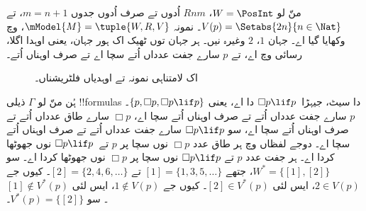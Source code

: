 \documentclass[../../../include/open-logic-section]{subfiles}
\begin{document}
\begin{ex}
  منّ لو $W = \PosInt$، $Rnm$ اُدوں تے صرف اُدوں جدوں $m = n + 1$، تے $V(p) = \Setabs{2n}{n \in
    \Nat}$۔ نمونہ $\mModel{M} = \tuple{W, R, V}$،
   وچ وکھایا گیا اے۔ جہان $1$، $2$ وغیرہ نیں۔ ہر جہان توں ٹھیک اک ہور جہان، یعنی اوہدا اگلا، رسائی وچ اے، تے $p$ سارے جفت عدداں اُتے سچا اے تے صرف اوہناں اُتے۔

  \begin{figure}
    \centering

    \caption{اک لامتناہی نمونہ تے اوہدیاں فلٹریشناں۔}
  \end{figure}

  ہُن منّ لو $\Gamma$ ذیلی !!{formula}s دا سیٹ، جیہڑا~$\Box p \lif p$ دا اے،
  یعنی $\{p, \Box p, \Box p \lif p\}$۔ $p$ سارے جفت عدداں اُتے تے صرف اوہناں اُتے سچا اے، $\Box p$ سارے طاق عدداں اُتے تے صرف اوہناں اُتے سچا اے، سو $\Box p \lif p$ سارے جفت عدداں اُتے تے صرف اوہناں اُتے سچا اے۔ دوجے لفظاں وچ ہر طاق عدد $\Box p$ نوں سچا پر $p$ تے~$\Box
  p \lif p$ نوں جھوٹھا کردا اے۔ ہر جفت عدد $p$ تے $\Box p \lif p$ نوں سچا پر $\Box p$ نوں جھوٹھا کردا اے۔ سو $W^* = \{ [1], [2] \}$، جتھے $[1] =
  \{1, 3, 5, \dots\}$ تے $[2] = \{2, 4, 6, \dots\}$۔ کیوں جے $2 \in
  V(p)$، ایس لئی $[2] \in V^*(p)$۔ کیوں جے $1 \notin V(p)$، ایس لئی $[1] \notin
  V^*(p)$۔ سو $V^*(p) = \{[2]\}$۔


\end{ex}
\end{document}
